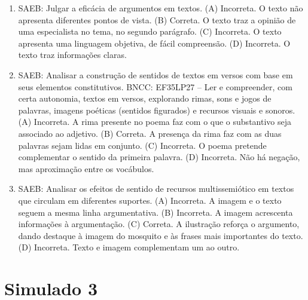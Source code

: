 \begin{enumerate}
\item
SAEB: Julgar a eficácia de argumentos em textos. 
(A) Incorreta. O texto não apresenta diferentes pontos de vista. 
(B) Correta. O texto traz a opinião de uma especialista no tema, no segundo parágrafo. 
(C) Incorreta. O texto apresenta uma linguagem objetiva, de fácil compreensão. 
(D) Incorreta. O texto traz informações claras.

\item
SAEB: Analisar a construção de sentidos de textos em versos com base em seus elementos constitutivos. BNCC: EF35LP27 -- Ler e compreender, com certa autonomia, textos em versos, explorando rimas, sons e jogos de palavras, imagens poéticas (sentidos figurados) e recursos visuais e sonoros.
(A) Incorreta. A rima presente no poema faz com o que o substantivo seja associado ao adjetivo. 
(B) Correta. A presença da rima faz com as duas palavras sejam lidas em conjunto.
(C) Incorreta. O poema pretende complementar o sentido da primeira palavra. 
(D) Incorreta. Não há negação, mas aproximação entre os vocábulos.

\item
SAEB: Analisar os efeitos de sentido de recursos multissemiótico em textos que circulam em diferentes suportes. 
(A) Incorreta. A imagem e o texto seguem a mesma linha argumentativa. 
(B) Incorreta. A imagem acrescenta informações à argumentação. 
(C) Correta. A ilustração reforça o argumento, dando destaque à imagem do mosquito e às frases mais importantes do texto. 
(D) Incorreta. Texto e imagem complementam um ao outro.
\end{enumerate}

\section*{Simulado 3}

